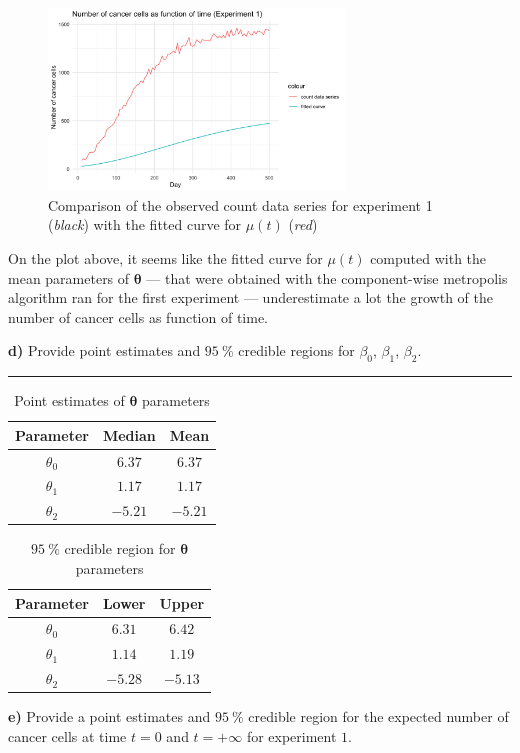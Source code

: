 \begin{figure}[H]
	\centering
	\includegraphics[width=0.7\textwidth]{figures/metropolis_cw_fitted_curve.png}
	\caption{Comparison of the observed count data series for experiment 1 (\textit{black}) with the fitted curve for $\mu(t)$ (\textit{red})}
	\label{fig:metropolis-cv-fitted-curve}
\end{figure}

On the plot above, it seems like the fitted curve for $\mu(t)$ computed with the mean parameters of $\bm{\theta}$ --- that were obtained with the component-wise metropolis algorithm ran for the first experiment --- underestimate a lot the growth of the number of cancer cells as function of time.

\textbf{d)} Provide point estimates and $\SI{95}{\percent}$ credible regions for $\beta_0$, $\beta_1$, $\beta_2$.

\begin{center}\rule{6cm}{0.4pt}\end{center}

\begin{table}[H]
	\centering\begin{tabular}{|c|c|c|} \hline 
		Parameter & Median & Mean \\ \hline 
		$\theta_0$ & $6.37$ & $6.37$ \\ 
		$\theta_1$ & $1.17$ & $1.17$ \\
		$\theta_2$ & $-5.21$ & $-5.21$ \\ \hline
	\end{tabular}
	\caption{Point estimates of $\bm{\theta}$ parameters}
	\label{tab:metropolis-cw-point-estimates}
\end{table}

\begin{table}[H]
	\centering\begin{tabular}{|c|c|c|} \hline 
		Parameter & Lower & Upper \\ \hline 
		$\theta_0$ & $6.31$ & $6.42$ \\ 
		$\theta_1$ & $1.14$ & $1.19$ \\
		$\theta_2$ & $-5.28$ & $-5.13$ \\ \hline
	\end{tabular}
	\caption{$\SI{95}{\percent}$ credible region for $\bm{\theta}$ parameters}
	\label{tab:metropolis-cw-credible-region}
\end{table}

\textbf{e)} Provide a point estimates and $\SI{95}{\percent}$ credible region for the expected number of cancer cells at time $t = 0$ and $t = +\infty$ for experiment $1$.